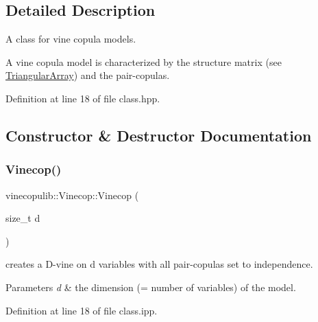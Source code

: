 \subsection{Detailed Description}
A class for vine copula models. 

A vine copula model is characterized by the structure matrix (see \hyperlink{classvinecopulib_1_1_triangular_array}{Triangular\+Array}) and the pair-\/copulas. 

Definition at line 18 of file class.\+hpp.



\subsection{Constructor \& Destructor Documentation}
\mbox{\label{classvinecopulib_1_1_vinecop_a391541e2795d06a848d5a17fe3496a63}} 
\subsubsection{\texorpdfstring{Vinecop()}{Vinecop()}\hspace{0.1cm}{\footnotesize\ttfamily [1/13]}}
{\footnotesize\ttfamily vinecopulib\+::\+Vinecop\+::\+Vinecop (\begin{DoxyParamCaption}\item[{size\+\_\+t}]{d }\end{DoxyParamCaption})\hspace{0.3cm}{\ttfamily [inline]}}



creates a D-\/vine on {\ttfamily d} variables with all pair-\/copulas set to independence. 


\begin{DoxyParams}{Parameters}
{\em d} & the dimension (= number of variables) of the model. \\
\hline
\end{DoxyParams}


Definition at line 18 of file class.\+ipp.

\mbox{\label{classvinecopulib_1_1_vinecop_abebc47fd9c68aeff199a3eba370a5f6a}} 
